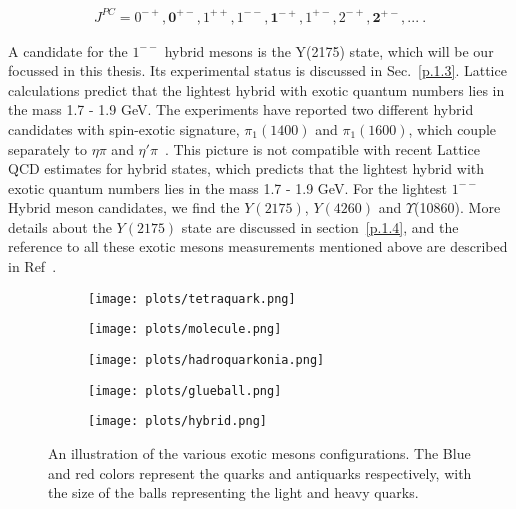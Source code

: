 \begin{equation}
    \label{eq.1.2.2}
    \begin{aligned}
        J^{PC} = 0^{-+}, \bm{0^{+-}}, 1^{++}, 1^{--}, \bm{1^{-+}}, 1^{+-}, 2^{-+}, \bm{2^{+-}},...~.
    \end{aligned}
\end{equation}

A candidate for the $1^{--}$ hybrid mesons is the Y(2175) state, which will be our focussed in this thesis. Its experimental status is discussed in Sec.~\ref{p.1.3}.
Lattice calculations predict that the lightest hybrid with exotic quantum numbers lies in the mass 1.7 - 1.9 GeV. The experiments have reported two different hybrid candidates with spin-exotic signature, $\pi_{1}(1400)$ and $\pi_{1}(1600)$, which couple separately to $\eta\pi$ and $\eta \prime \pi$~\cite{8}. This picture is not compatible with recent Lattice QCD estimates for hybrid states, which predicts that the lightest hybrid with exotic quantum numbers lies in the mass 1.7 - 1.9 GeV. For the lightest $1^{--}$ Hybrid meson candidates, we find the $Y(2175)$, $Y(4260)$ and $\Upsilon$(10860). More details about the $Y(2175)$ state are discussed in section~\ref{p.1.4}, and the reference to all these exotic mesons measurements mentioned above are described in Ref~\cite{8}.

\begin{figure}[H]
    \centering
    \begin{subfigure}[b]{0.2\textwidth}
        \texttt{[image: plots/tetraquark.png]}
        \caption{}
        \label{fig.1.2.2.a}
    \end{subfigure}\hfill
    \begin{subfigure}[b]{0.2\textwidth}
        \texttt{[image: plots/molecule.png]}
        \caption{}
        \label{fig.1.2.2.b}
    \end{subfigure}\hfill
    \begin{subfigure}[b]{0.2\textwidth}
        \texttt{[image: plots/hadroquarkonia.png]}
        \caption{}
        \label{fig.1.2.2.c}
    \end{subfigure}\hfill
    \begin{subfigure}[b]{0.2\textwidth}
        \texttt{[image: plots/glueball.png]}
        \caption{}
        \label{fig.1.2.2.d}
    \end{subfigure}\hfill
    \begin{subfigure}[b]{0.2\textwidth}
        \texttt{[image: plots/hybrid.png]}
        \caption{}
        \label{fig.1.2.2.e}
    \end{subfigure}    
    \caption{An illustration of the various exotic mesons configurations. The Blue and red colors represent the quarks and antiquarks respectively, with the size of the balls representing the light and heavy quarks.}
    \label{fig.1.2.2}
\end{figure}

